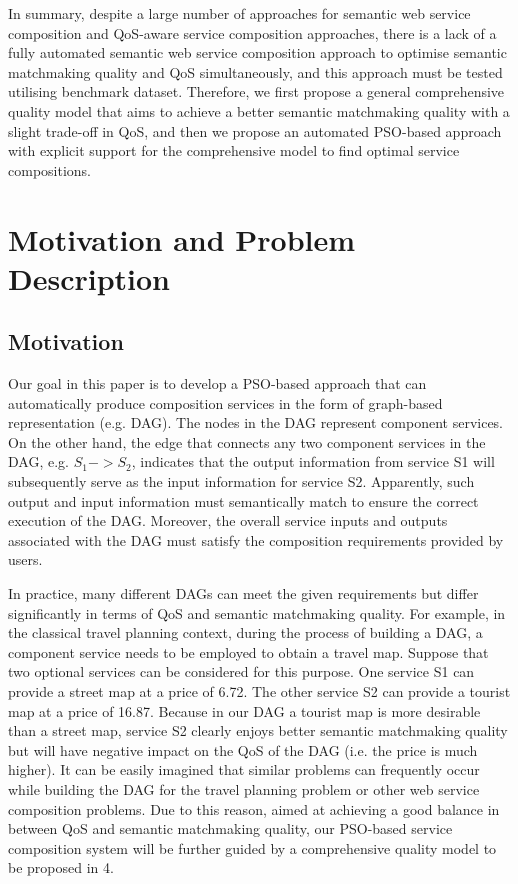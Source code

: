 \documentclass{llncs}
\begin{document}
In summary, despite a large number of approaches for semantic web service composition and QoS-aware service composition approaches, there is a lack of a fully automated semantic web service composition approach to optimise semantic matchmaking quality and QoS simultaneously, and this approach must be tested utilising benchmark dataset. Therefore, we first propose a general comprehensive quality model that aims to achieve a better semantic matchmaking quality with a slight trade-off in QoS, and then we propose an automated PSO-based approach with explicit support for the comprehensive model to find optimal service compositions.

\section{Motivation and Problem Description}\label{Motivation and Problem Description}
\subsection{Motivation}\label{Motivation}

Our goal in this paper is to develop a PSO-based approach that can automatically produce composition services in the form of graph-based representation (e.g. DAG). The nodes in the DAG represent component services. On the other hand, the edge that connects any two component services in the DAG, e.g. $S_1->S_2$, indicates that the output information from service S1 will subsequently serve as the input information for service S2. Apparently, such output and input information must semantically match to ensure the correct execution of the DAG. Moreover, the overall service inputs and outputs associated with the DAG must satisfy the composition requirements provided by users.
 
In practice, many different DAGs can meet the given requirements but differ significantly in terms of QoS and semantic matchmaking quality. For example, in the classical travel planning context, during the process of building a DAG, a component service needs to be employed to obtain a travel map. Suppose that two optional services can be considered for this purpose. One service S1 can provide a street map at a price of 6.72. The other service S2 can provide a tourist map at a price of 16.87. Because in our DAG a tourist map is more desirable than a street map, service S2 clearly enjoys better semantic matchmaking quality but will have negative impact on the QoS of the DAG (i.e. the price is much higher). It can be easily imagined that similar problems can frequently occur while building the DAG for the travel planning problem or other web service composition problems. Due to this reason, aimed at achieving a good balance in between QoS and semantic matchmaking quality, our PSO-based service composition system will be further guided by a comprehensive quality model to be proposed in 4.
\end{document}
